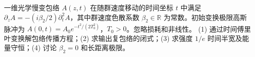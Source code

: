 一维光学慢变包络 \(A(z,t)\) 在随群速度移动的时间坐标 \(t\) 中满足 \(\partial_z A=-(i\beta_2/2)\partial_t^2 A\)，其中群速度色散系数 \(\beta_2\in\mathbb R\) 为常数。初始变换极限高斯脉冲为 \(A(0,t)=A_0e^{-t^2/(2T_0^2)}\)，\(T_0>0\)。忽略损耗和非线性。
(1) 通过时间傅里叶变换解包络传播方程；(2) 求输出复包络的闭式；(3) 求强度 \(1/e\) 时间半宽及能量守恒；(4) 讨论 \(\beta_2=0\) 和长距离极限。

